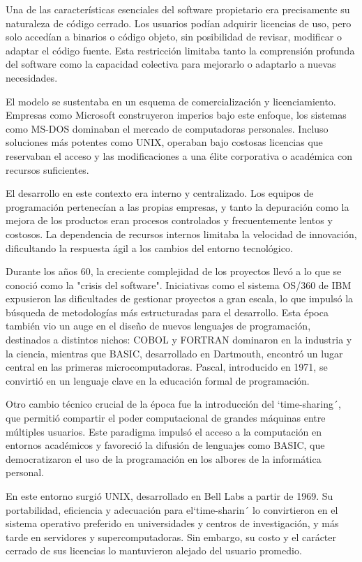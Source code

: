 \documentclass[a4paper,12pt]{article}
\begin{document}
Una de las características esenciales del software propietario era precisamente
su naturaleza de código cerrado. Los usuarios podían adquirir licencias de uso,
pero solo accedían a binarios o código objeto, sin posibilidad de revisar,
modificar o adaptar el código fuente. Esta restricción limitaba tanto la
comprensión profunda del software como la capacidad colectiva para mejorarlo o
adaptarlo a nuevas necesidades.

El modelo se sustentaba en un esquema de comercialización y licenciamiento.
Empresas como Microsoft construyeron imperios bajo este enfoque, los sistemas
como MS-DOS dominaban el mercado de computadoras personales. Incluso soluciones
más potentes como UNIX, operaban bajo costosas licencias que reservaban el
acceso y las modificaciones a una élite corporativa o académica con recursos
suficientes.

El desarrollo en este contexto era interno y centralizado. Los equipos de
programación pertenecían a las propias empresas, y tanto la depuración como la
mejora de los productos eran procesos controlados y frecuentemente lentos y
costosos. La dependencia de recursos internos limitaba la velocidad de
innovación, dificultando la respuesta ágil a los cambios del entorno
tecnológico.

Durante los años 60, la creciente complejidad de los proyectos llevó a lo que se
conoció como la "crisis del software". Iniciativas como el sistema OS/360 de IBM
expusieron las dificultades de gestionar proyectos a gran escala, lo que impulsó
la búsqueda de metodologías más estructuradas para el desarrollo. Esta época
también vio un auge en el diseño de nuevos lenguajes de programación, destinados
a distintos nichos: COBOL y FORTRAN dominaron en la industria y la ciencia,
mientras que BASIC, desarrollado en Dartmouth, encontró un lugar central en las
primeras microcomputadoras. Pascal, introducido en 1971, se convirtió en un
lenguaje clave en la educación formal de programación.

Otro cambio técnico crucial de la época fue la introducción del `time-sharing´,
que permitió compartir el poder computacional de grandes máquinas entre
múltiples usuarios. Este paradigma impulsó el acceso a la computación en
entornos académicos y favoreció la difusión de lenguajes como BASIC, que
democratizaron el uso de la programación en los albores de la informática
personal.

En este entorno surgió UNIX, desarrollado en Bell Labs a partir de 1969. Su
portabilidad, eficiencia y adecuación para el`time-sharin´ lo convirtieron en el
sistema operativo preferido en universidades y centros de investigación, y más
tarde en servidores y supercomputadoras. Sin embargo, su costo y el carácter
cerrado de sus licencias lo mantuvieron alejado del usuario promedio.
\end{document}
